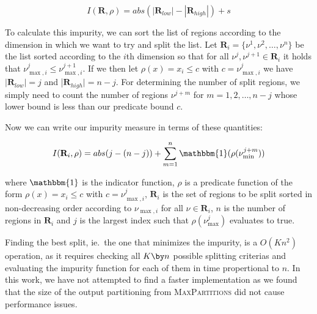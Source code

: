\[
    I(\mathbf{R}, \rho)  = abs(|\mathbf{R}_{low}| -
    |\mathbf{R}_{high}|) + s
\]

To calculate this impurity, we can sort the list of regions according to the
dimension in which we want to try and split the list. Let $\mathbf{R}_i = \{
\nu^1, \nu^2, \ldots, \nu^n \}$ be the list sorted according to the $i$th
dimension so that for all $\nu^j, \nu^{j+1} \in \mathbf{R}_{i}$ it holds that
$\nu^{j}_{\max,i} \le \nu^{j+1}_{\max,i}$. If we then let $\rho(x) = x_i \le c$
with $c = \nu^{j}_{\max,i}$ we have $|\mathbf{R}_{low}| = j$ and
|$\mathbf{R}_{high}| = n - j$. For determining the number of split regions, we
simply need to count the number of regions $\nu^{j+m}$ for $m = 1, 2, \ldots,
n-j$ whose lower bound is less than our predicate bound $c$.


Now we can write our impurity measure in terms of these quantities:

\[
    I(\mathbf{R}_{i}, \rho)
    = abs(j - (n - j)) +
    \sum^{n}_{m=1} \mathbbm{1}(\rho(\nu^{j+m}_{\min}))
\]


\noindent
where $\mathbbm{1}$ is the indicator function, $\rho$ is a predicate function
of the form $\rho(x) = x_{i} \leq c$ with $c = \nu^{j}_{\max, i}$,
$\mathbf{R}_{i}$ is the set of regions to be split sorted in non-decreasing
order according to $\nu_{\max,i}$ for all $\nu \in \mathbf{R}_{i}$, $n$ is the
number of regions in $\mathbf{R}_{i}$ and $j$ is the largest index such that
$\rho(\nu^{j}_{\max})$ evaluates to true.

Finding the best split, ie.\ the one that minimizes the impurity, is a $O(Kn^2)$
operation, as it requires checking all $K \by n$ possible splitting criterias
and evaluating the impurity function for each of them in time propertional to
$n$. In this work, we have not attempted to find a faster implementation as we
found that the size of the output partitioning from \textsc{MaxPartitions} did
not cause performance issues.


